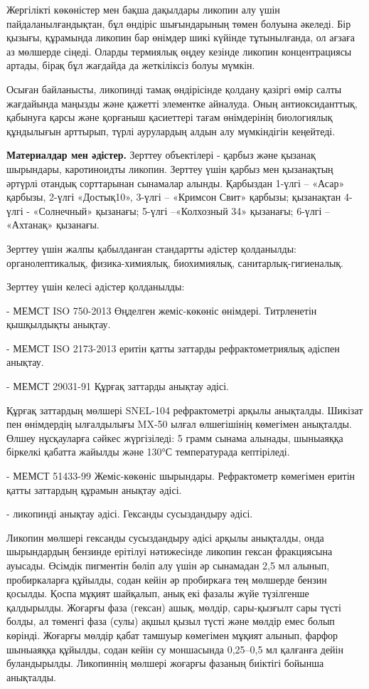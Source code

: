 Жергілікті көкөністер мен бақша дақылдары ликопин алу үшін
пайдаланылғандықтан, бұл өндіріс шығындарының төмен болуына әкеледі. Бір
қызығы, құрамында ликопин бар өнімдер шикі күйінде тұтынылғанда, ол
ағзаға аз мөлшерде сіңеді. Оларды термиялық өңдеу кезінде ликопин
концентрациясы артады, бірақ бұл жағдайда да жеткіліксіз болуы мүмкін.

Осыған байланысты, ликопинді тамақ өндірісінде қолдану қазіргі өмір
салты жағдайында маңызды және қажетті элементке айналуда. Оның
антиоксиданттық, қабынуға қарсы және қорғаныш қасиеттері тағам
өнімдерінің биологиялық құндылығын арттырып, түрлі аурулардың алдын алу
мүмкіндігін кеңейтеді.

{\bfseries Материалдар мен әдістер.} Зерттеу объектілері - қарбыз және
қызанақ шырындары, каротиноидты ликопин. Зерттеу үшін қарбыз мен
қызанақтың әртүрлі отандық сорттарынан сынамалар алынды. Қарбыздан
1-үлгі -- «Асар» қарбызы, 2-үлгі «Достық10», 3-үлгі -- «Кримсон Свит»
қарбызы; қызанақтан 4-үлгі - «Солнечный» қызанағы; 5-үлгі --«Колхозный
34» қызанағы; 6-үлгі -- «Ахтанақ» қызанағы.

Зерттеу үшін жалпы қабылданған стандартты әдістер қолданылды:
органолептикалық, физика-химиялық, биохимиялық, санитарлық-гигиеналық.

Зерттеу үшін келесі әдістер қолданылды:

- МЕМСТ ISO 750-2013 Өңделген жеміс-көкөніс өнімдері. Титрленетін
қышқылдықты анықтау.

- МЕМСТ ISO 2173-2013 еритін қатты заттарды рефрактометриялық әдіспен
анықтау.

- МЕМСТ 29031-91 Құрғақ заттарды анықтау әдісі.

Құрғақ заттардың мөлшері SNEL-104 рефрактометрі арқылы анықталды.
Шикізат пен өнімдердің ылғалдылығы MX-50 ылғал өлшегішінің көмегімен
анықталды. Өлшеу нұсқауларға сәйкес жүргізіледі: 5 грамм сынама алынады,
шыныаяққа біркелкі қабатта жайылды және 130°С температурада кептіріледі.

- МЕМСТ 51433-99 Жеміс-көкөніс шырындары. Рефрактометр көмегімен еритін
қатты заттардың құрамын анықтау әдісі.

- ликопинді анықтау әдісі. Гександы сусыздандыру әдісі.

Ликопин мөлшері гександы сусыздандыру әдісі арқылы анықталды, онда
шырындардың бензинде ерітілуі нәтижесінде ликопин гексан фракциясына
ауысады. Өсімдік пигментін бөліп алу үшін әр сынамадан 2,5 мл алынып,
пробиркаларға құйылды, содан кейін әр пробиркаға тең мөлшерде бензин
қосылды. Қоспа мұқият шайқалып, анық екі фазалы жүйе түзілгенше
қалдырылды. Жоғарғы фаза (гексан) ашық, мөлдір, сары-қызғылт сары түсті
болды, ал төменгі фаза (сулы) ақшыл қызыл түсті және мөлдір емес болып
көрінді. Жоғарғы мөлдір қабат тамшуыр көмегімен мұқият алынып, фарфор
шыныаяққа құйылды, содан кейін су моншасында 0,25--0,5 мл қалғанға дейін
буландырылды. Ликопиннің мөлшері жоғарғы фазаның биіктігі бойынша
анықталды.

